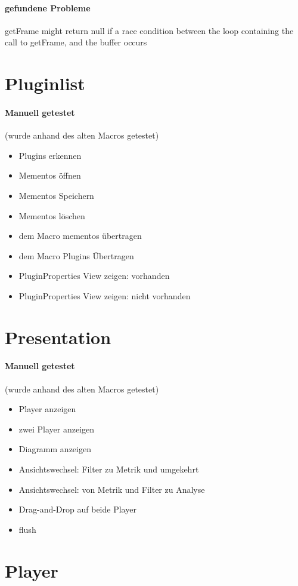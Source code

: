 \paragraph*{gefundene Probleme}
getFrame might return null if a race condition between the loop containing the call to getFrame, and the buffer occurs
\section{Pluginlist}
\paragraph{Manuell getestet}
(wurde anhand des alten Macros getestet)
\begin{itemize}
\item Plugins erkennen
\item Mementos öffnen
\item Mementos Speichern
\item Mementos löschen
\item dem Macro mementos übertragen
\item dem Macro Plugins Übertragen
\item PluginProperties View zeigen: vorhanden
\item PluginProperties View zeigen: nicht vorhanden
\end{itemize}


\section{Presentation}
\paragraph{Manuell getestet}
(wurde anhand des alten Macros getestet)
\begin{itemize}
\item Player anzeigen
\item zwei Player anzeigen
\item Diagramm anzeigen
\item Ansichtswechsel: Filter zu Metrik und umgekehrt
\item Ansichtswechsel: von Metrik und Filter zu Analyse
\item Drag-and-Drop auf beide Player
\item flush
\end{itemize}

\section{Player}

